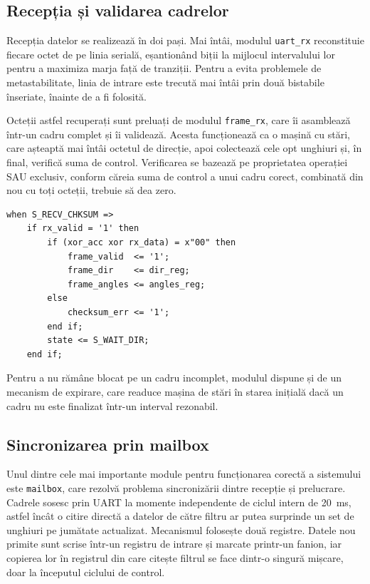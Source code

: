 \subsection{Recepția și validarea cadrelor}

Recepția datelor se realizează în doi pași. Mai întâi, modulul \texttt{uart\_rx}
reconstituie fiecare octet de pe linia serială, eșantionând biții la mijlocul
intervalului lor pentru a maximiza marja față de tranziții. Pentru a evita
problemele de metastabilitate, linia de intrare este trecută mai întâi prin două
bistabile înseriate, înainte de a fi folosită.

Octeții astfel recuperați sunt preluați de modulul \texttt{frame\_rx}, care îi
asamblează într-un cadru complet și îi validează. Acesta funcționează ca o mașină
cu stări, care așteaptă mai întâi octetul de direcție, apoi colectează cele opt
unghiuri și, în final, verifică suma de control. Verificarea se bazează pe
proprietatea operației SAU exclusiv, conform căreia suma de control a unui cadru
corect, combinată din nou cu toți octeții, trebuie să dea zero.

\begin{lstlisting}[caption={Verificarea sumei de control la recepție.},label={lst:checksum}]
when S_RECV_CHKSUM =>
    if rx_valid = '1' then
        if (xor_acc xor rx_data) = x"00" then
            frame_valid  <= '1';
            frame_dir    <= dir_reg;
            frame_angles <= angles_reg;
        else
            checksum_err <= '1';
        end if;
        state <= S_WAIT_DIR;
    end if;
\end{lstlisting}

Pentru a nu rămâne blocat pe un cadru incomplet, modulul dispune și de un mecanism
de expirare, care readuce mașina de stări în starea inițială dacă un cadru nu este
finalizat într-un interval rezonabil.

\subsection{Sincronizarea prin mailbox}

Unul dintre cele mai importante module pentru funcționarea corectă a sistemului este
\texttt{mailbox}, care rezolvă problema sincronizării dintre recepție și prelucrare.
Cadrele sosesc prin UART la momente independente de ciclul intern de 20~ms, astfel
încât o citire directă a datelor de către filtru ar putea surprinde un set de
unghiuri pe jumătate actualizat. Mecanismul folosește două registre. Datele nou
primite sunt scrise într-un registru de intrare și marcate printr-un fanion, iar
copierea lor în registrul din care citește filtrul se face dintr-o singură mișcare,
doar la începutul ciclului de control.

